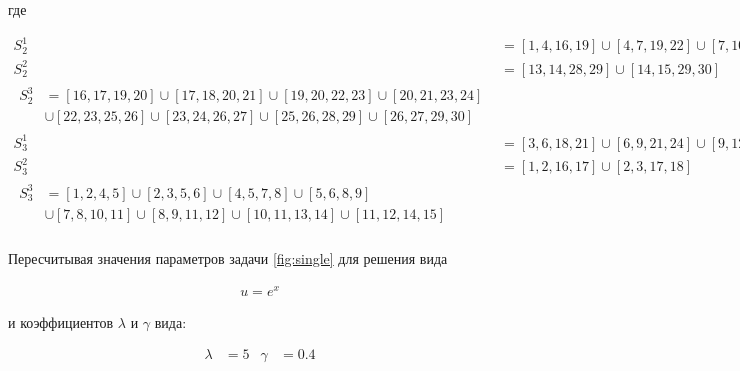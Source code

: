 \documentclass[12pt, a4paper]{article}
\begin{document}
\noindent где

\vspace{5mm}
\begin{align*}
  S_2^1 &= 
          \left[ 1, 4, 16, 19 \right] 
    \cup  \left[ 4, 7, 19, 22 \right]
    \cup  \left[ 7, 10, 22, 25 \right] 
    \cup  \left[ 10, 13, 25, 28 \right] \\
  S_2^2 &= 
          \left[ 13, 14, 28, 29 \right] 
    \cup  \left[ 14, 15, 29, 30 \right] \\
  \begin{split}
    S_2^3 &= 
            \left[ 16, 17, 19, 20 \right] 
      \cup  \left[ 17, 18, 20, 21 \right]
      \cup  \left[ 19, 20, 22, 23 \right] 
      \cup  \left[ 20, 21, 23, 24 \right] \\
     &\cup  \left[ 22, 23, 25, 26 \right] 
      \cup  \left[ 23, 24, 26, 27 \right]
      \cup  \left[ 25, 26, 28, 29 \right] 
      \cup  \left[ 26, 27, 29, 30 \right]
  \end{split} \\
  S_3^1 &= 
          \left[ 3, 6, 18, 21 \right] 
    \cup  \left[ 6, 9, 21, 24 \right]
    \cup  \left[ 9, 12, 24, 27 \right]
    \cup  \left[ 12, 15, 27, 30 \right] \\
  S_3^2 &= 
          \left[ 1, 2, 16, 17 \right] 
    \cup  \left[ 2, 3, 17, 18 \right] \\
  \begin{split}
    S_3^3 &= 
            \left[ 1, 2, 4, 5 \right] 
      \cup  \left[ 2, 3, 5, 6 \right]
      \cup  \left[ 4, 5, 7, 8 \right] 
      \cup  \left[ 5, 6, 8, 9 \right] \\
     &\cup  \left[ 7, 8, 10, 11 \right] 
      \cup  \left[ 8, 9, 11, 12 \right]
      \cup  \left[ 10, 11, 13, 14 \right] 
      \cup  \left[ 11, 12, 14, 15 \right]
  \end{split} \\
\end{align*}
\vspace{2mm}

\noindent Пересчитывая значения параметров задачи \ref{fig:single} для решения вида

\begin{align}
  \label{fun} u = e^x
\end{align}

\noindent и коэффициентов $\lambda$ и $\gamma$ вида:

\begin{align*}
  \lambda &= 5 & \gamma &= 0.4
\end{align*}
\end{document}
